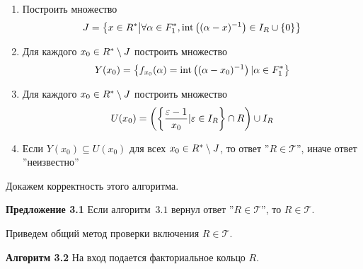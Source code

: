 \documentclass[_00_autoref.tex]{subfiles}
\begin{document}
    \begin{enumerate}
        \item Построить множество
        \begin{equation*}
            J = \left\{
                x \in R^{*} \big| \forall \alpha \in F_1^{*}, \textrm{int}\left((\alpha - x)^{-1}\right) \in I_{R} \cup \{0\}
            \right\}
        \end{equation*}
        
        \item Для каждого $x_0 \in R^{*} \setminus J$ построить множество
        \begin{equation*}
            Y(x_0) = \left\{
                f_{x_0}(\alpha) = \textrm{int}\left((\alpha - x_0)^{-1}\right) | \alpha \in F_1^{*}
            \right\}
        \end{equation*}
        
        \item Для каждого $x_0 \in R^{*} \setminus J$ построить множество
        \begin{equation*}
            U(x_0) = \left(
                \left\{
                    \frac{\varepsilon - 1}{x_0} | \varepsilon \in I_{R}
                \right\} \cap R
            \right) \cup I_{R}
        \end{equation*}
        
        \item Если $Y(x_0) \subseteq U(x_0)$ для всех $x_0 \in R^{*} \setminus J$, то ответ ''$R \in \mathcal{T}$'', иначе ответ ''неизвестно''
    \end{enumerate}

Докажем корректность этого алгоритма.

\textbf{Предложение 3.1}
    Если алгоритм~$3.1$ вернул ответ ''$R \in \mathcal{T}$'', то $R \in \mathcal{T}$.


Приведем общий метод проверки включения $R \in \mathcal{T}$.

\textbf{Алгоритм 3.2}\label{algorithm:R_in_T}
    На вход подается факториальное кольцо $R$.
    
\end{document}
